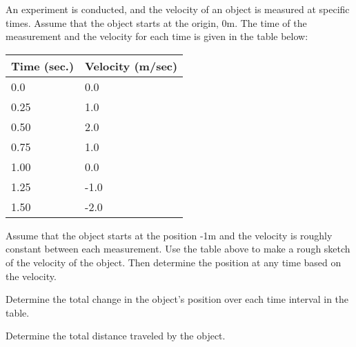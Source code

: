 \begin{problem}
\item
\end{problem}



\begin{problem}
\item An experiment is conducted, and the velocity of an object is
  measured at specific times. Assume that the object starts at the
  origin, 0m. The time of the measurement and the
  velocity for each time is given in the table below: \\
  \begin{tabular}{l|l}
    Time (sec.) & Velocity (m/sec) \\ \hline
    0.0  & 0.0 \\
    0.25 & 1.0 \\
    0.50 & 2.0 \\
    0.75 & 1.0 \\
    1.00 & 0.0 \\
    1.25 & -1.0 \\
    1.50 & -2.0
  \end{tabular}

  \begin{subproblem}
  \item Assume that the object starts at the position -1m and the
    velocity is roughly constant between each measurement. Use the
    table above to make a rough sketch of the velocity of the
    object. Then determine the position at any time based on the
    velocity.  

    \scalebox{0.7}{}

  \item Determine the total change in the object's position over each
    time interval in the table.

    \vfill

  \item Determine the total distance traveled by the object.

    \vfill

  \end{subproblem}

  \clearpage


\end{problem}
